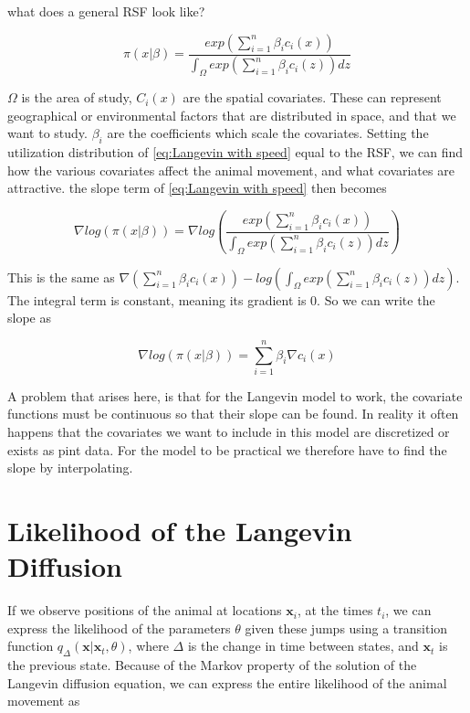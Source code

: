 what does a general RSF look like?

\begin{equation}
    \pi(x|\beta) = \frac{exp(\sum_{i=1}^n\beta_i c_i(x))}{\int_\Omega exp(\sum_{i=1}^n\beta_i c_i(z))dz}
    \label{eq: resource selection function}
\end{equation}

$\Omega$ is the area of study, $C_i(x)$ are the spatial covariates. These can represent geographical or environmental factors that are distributed in space, and that we want to study. $\beta_i$ are the coefficients which scale the covariates. Setting the utilization distribution of \eqref{eq:Langevin with speed} equal to the RSF, we can find how the various covariates affect the animal movement, and what covariates are attractive. the slope term of \eqref{eq:Langevin with speed} then becomes

\begin{equation}
    \nabla log(\pi(x|\beta)) = \nabla log(\frac{exp(\sum_{i=1}^n\beta_i c_i(x))}{\int_\Omega exp(\sum_{i=1}^n\beta_i c_i(z))dz}) 
\end{equation}

This is the same as $\nabla (\sum_{i=1}^n\beta_i c_i(x)) - log(\int_\Omega exp(\sum_{i=1}^n\beta_i c_i(z))dz)$. The integral term is constant, meaning its gradient is 0. So we can write the slope as

\begin{equation}
    \nabla log(\pi(x|\beta)) = \sum_{i=1}^n \beta_i \nabla c_i(x)
\end{equation}

A problem that arises here, is that for the Langevin model to work, the covariate functions must be continuous so that their slope can be found. In reality it often happens that the covariates we want to include in this model are discretized or exists as pint data. For the model to be practical we therefore have to find the slope by interpolating. 


\section{Likelihood of the Langevin Diffusion}
If we observe positions of the animal at locations $\textbf{x}_i$, at the times $t_i$, we can express the likelihood of the parameters $\theta$ given these jumps using a transition function $q_\Delta(\textbf{x} | \textbf{x}_t, \theta)$, where $\Delta$ is the change in time between states, and $\textbf{x}_t$ is the previous state. Because of the Markov property of the solution of the Langevin diffusion equation, we can express the entire likelihood of the animal movement as

